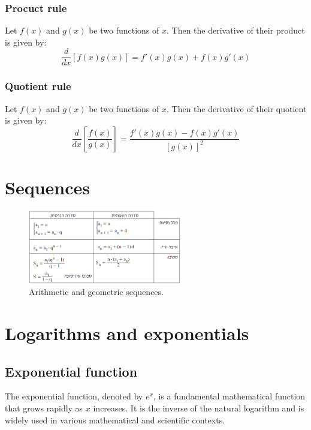 \documentclass[11pt]{book} %
\begin{document}
\subsubsection{Procuct rule}
Let $f(x)$ and $g(x)$ be two functions of $x$. 
Then the derivative of their product is given by:
\begin{equation}
    \frac{d}{dx} [f(x)g(x)] = f'(x)g(x) + f(x)g'(x)
\end{equation}

\subsubsection{Quotient rule}
Let $f(x)$ and $g(x)$ be two functions of $x$. 
Then the derivative of their quotient is given by:
\begin{equation}
    \frac{d}{dx} \left[\frac{f(x)}{g(x)}\right] = \frac{f'(x)g(x) - f(x)g'(x)}{[g(x)]^2}
\end{equation}

\section{Sequences}

\begin{figure}
    \centering
    \includegraphics[width=0.6\textwidth]{Figs/sequences.png}
    \caption{Arithmetic and geometric sequences.}
    \label{fig:sequence}
\end{figure}

\section{Logarithms and exponentials}


\subsection{Exponential function}
The exponential function, denoted by \(e^x\), is a fundamental mathematical function that grows rapidly as \(x\) increases. 
It is the inverse of the natural logarithm and is widely used in various mathematical and scientific contexts.
\end{document}
